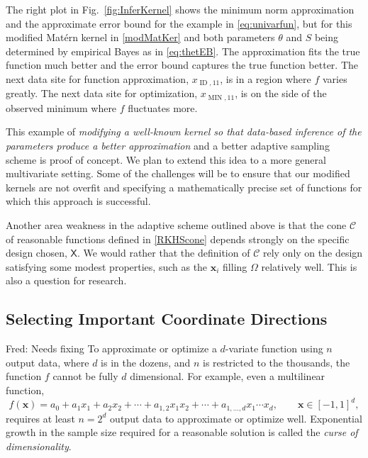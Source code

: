 \documentclass[11pt]{NSFamsart}
\DeclareMathOperator{\MIN}{MIN}
\DeclareMathOperator{\ID}{ID}
\newcommand{\mX}{\mathsf{X}}
\newcommand{\bx}{{\boldsymbol{x}}}
\newcommand{\calc}{{\mathcal{C}}}
\newcommand{\FJHNote}[1]{{\color{blue}Fred: #1}}
\begin{document}
The right plot in Fig.\ \ref{fig:InferKernel} shows the minimum norm approximation and the approximate error bound for the example in \eqref{eq:univarfun}, but for this modified Mat\'ern kernel in \eqref{modMatKer} and both parameters $\theta$ and $S$ being determined by empirical Bayes as in \eqref{eq:thetEB}.  The approximation fits the true function much better and the error bound captures the true function better.  The next data site for function approximation, $x_{\ID,11}$, is in a region where $f$ varies greatly.  The next data site for optimization, $x_{\MIN,11}$,  is on the side of the observed minimum where $f$ fluctuates more.

This example of \emph{modifying a well-known kernel so that data-based inference of the parameters produce a better approximation} and a better adaptive sampling scheme is proof of concept.  We plan to extend this idea to a more general multivariate setting.  Some of the challenges will be to ensure that our modified kernels are not overfit and specifying a mathematically precise set of functions for which this approach is successful.

Another area weakness in the adaptive scheme outlined above is that the cone $\calc$ of reasonable functions defined in  \eqref{RKHScone} depends strongly on the specific design chosen, $\mX$.  We would rather that the definition of $\calc$ rely only on the design satisfying some modest properties, such as the $\bx_i$ filling  $\Omega$ relatively well.  This is also a question for research.

\subsection{Selecting Important Coordinate Directions} \label{sec:selectCoord}

\FJHNote{Needs fixing}
To approximate or optimize a $d$-variate function using $n$ output data, where $d$ is in the dozens, and $n$ is restricted to the thousands, the function $f$ cannot be fully $d$ dimensional.  For example, even a multilinear function,
\begin{equation*}
    f(\bx) = a_0 + a_1 x_1 + a_2 x_2 + \cdots + a_{1,2} x_1 x_2 + \cdots + a_{1,\ldots, d}x_1 \cdots x_d, \qquad \bx \in [-1,1]^d,
\end{equation*}
requires at least $n = 2^d$ output data to approximate or optimize well.  Exponential growth in the sample size required for a reasonable solution is called the \emph{curse of dimensionality}.
\end{document}
